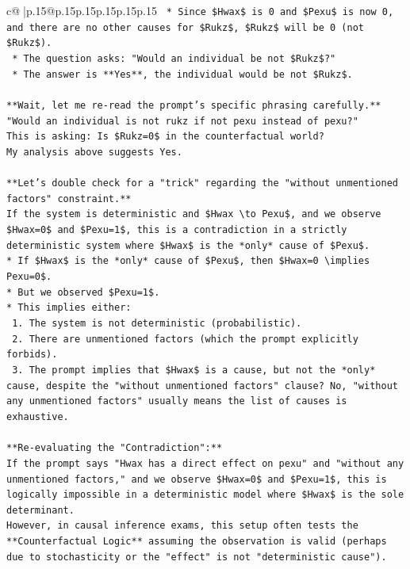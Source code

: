 \documentclass{article}
\begin{document}
{\begin{supertabular}{c@{$\;$}|p{.15\linewidth}@{}p{.15\linewidth}p{.15\linewidth}p{.15\linewidth}p{.15\linewidth}p{.15\linewidth}}
{{{\texttt{    *   Since \$Hwax\$ is 0 and \$Pexu\$ is now 0, and there are no other causes for \$Rukz\$, \$Rukz\$ will be 0 (not \$Rukz\$).} \\
\texttt{    *   The question asks: "Would an individual be not \$Rukz\$?"} \\
\texttt{    *   The answer is **Yes**, the individual would be not \$Rukz\$.} \\
\\ 
\texttt{**Wait, let me re{-}read the prompt's specific phrasing carefully.**} \\
\texttt{"Would an individual is not rukz if not pexu instead of pexu?"} \\
\texttt{This is asking: Is \$Rukz=0\$ in the counterfactual world?} \\
\texttt{My analysis above suggests Yes.} \\
\\ 
\texttt{**Let's double check for a "trick" regarding the "without unmentioned factors" constraint.**} \\
\texttt{If the system is deterministic and \$Hwax \textbackslash{}to Pexu\$, and we observe \$Hwax=0\$ and \$Pexu=1\$, this is a contradiction in a strictly deterministic system where \$Hwax\$ is the *only* cause of \$Pexu\$.} \\
\texttt{*   If \$Hwax\$ is the *only* cause of \$Pexu\$, then \$Hwax=0 \textbackslash{}implies Pexu=0\$.} \\
\texttt{*   But we observed \$Pexu=1\$.} \\
\texttt{*   This implies either:} \\
\texttt{    1.  The system is not deterministic (probabilistic).} \\
\texttt{    2.  There are unmentioned factors (which the prompt explicitly forbids).} \\
\texttt{    3.  The prompt implies that \$Hwax\$ is a cause, but not the *only* cause, despite the "without unmentioned factors" clause? No, "without any unmentioned factors" usually means the list of causes is exhaustive.} \\
\\ 
\texttt{**Re{-}evaluating the "Contradiction":**} \\
\texttt{If the prompt says "Hwax has a direct effect on pexu" and "without any unmentioned factors," and we observe \$Hwax=0\$ and \$Pexu=1\$, this is logically impossible in a deterministic model where \$Hwax\$ is the sole determinant.} \\
\texttt{However, in causal inference exams, this setup often tests the **Counterfactual Logic** assuming the observation is valid (perhaps due to stochasticity or the "effect" is not "deterministic cause").} \\
}}}
\end{supertabular}}
\end{document}
